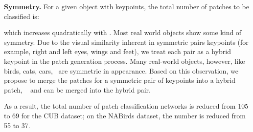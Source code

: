 \noindent\textbf{Symmetry.} 
For a given object with  keypoints, the total number of patches to be classified is:

which increases quadratically with .
Most real world objects show some kind of symmetry. Due to the visual
similarity inherent in symmetric pairs keypoints (for example, right and left eyes, wings and feet), we treat
each pair as a hybrid keypoint in the patch generation process.  Many real-world objects, however, like birds, cats, cars, \etc~are symmetric in appearance.  Based on this observation, we propose to merge the patches for a symmetric pair of keypoints into a hybrid patch, \eg~ and  can be merged into the hybrid  pair.
\begin{comment}
We then train a separate CNN model for each hybrid patch.
We observe consistent patch accuracy increase after applying symmetry to the dataset, we believe this is caused by larger training set size.
Additionally, we also reduce the patch classifier number.
For example, in the CUB dataset, total classifiers are reduced from from 105 to 69.  For the NABirds dataset, total classifiers are reduced from 55 yo 37.
At inference stage, we apply hybrid patch model to each original patch, so we still have the full set of patch scores.
\end{comment}

As a result, the total number of patch classification networks is reduced from 105 to 69 for the CUB dataset; on the NABirds dataset, the number is reduced from 55 to 37.

